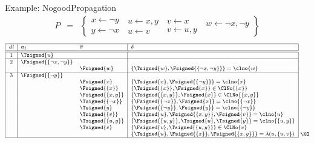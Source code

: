 \begin{frame}{Example: {NogoodPropagation}}
%
\begin{eqnarray*}
P
& = &
\left\{
  \begin{array}{l}
x  \leftarrow  \neg y\\%
y  \leftarrow  \neg x
\end{array}
\
\begin{array}{l}
u  \leftarrow x,y\\%
u  \leftarrow v%
\end{array}
\
\begin{array}{l}
v  \leftarrow x\\%
v  \leftarrow u,y%
\end{array}
\
\begin{array}{l}
w  \leftarrow \neg x,\neg y\\
\mbox{~}
\end{array}
\right\}
\end{eqnarray*}
%
\[
\footnotesize
\begin{array}[b]{|c|ll|l|}
\hline
\mathit{dl}& \sigma_{\!d} & \overline{\sigma} & \delta
\\\hline\hline
1 & \Tsigned{u} & &
\\\hline
2 & \Fsigned{\{\neg x,\neg y\}} & &
\\
  & & \Fsigned{w}     & \{\Tsigned{w},\Fsigned{\{\neg x,\neg y\}}\}=\clno{w}
\\\hline
3 & \Fsigned{\{\neg y\}} & &
\\
  & & \Fsigned{x}     & \{\Tsigned{x},\Fsigned{\{\neg y\}}\}=\clno{x}
\\
  & & \Fsigned{\{x\}} & \{\Tsigned{\{x\}},\Fsigned{x}\}\in\ClNo{\{x\}}
\\
  & & \Fsigned{\{x,y\}} & \{\Tsigned{\{x,y\}},\Fsigned{x}\}\in\ClNo{\{x,y\}}
\\
  & & \Tsigned{\{\neg x\}} & \{\Fsigned{\{\neg x\}},\Fsigned{x}\}=\clno{\{\neg x\}}
\\
  & & \Tsigned{y} & \{\Fsigned{\{\neg y\}},\Fsigned{y}\}=\clno{\{\neg y\}}
\\
  & & \Tsigned{\{v\}} & \{\Tsigned{u},\Fsigned{\{x,y\}},\Fsigned\{v\}\}=\clno{u}
\\
  & & \Tsigned{\{u,y\}} & \{\Fsigned{\{u,y\}},\Tsigned{u},\Tsigned{y}\}=\clno{\{u,y\}}
\\
  & & \Tsigned{v} & \{\Fsigned{v},\Tsigned{\{u,y\}}\}\in\ClNo{v}
\\
  & & & \{\Tsigned{u},\Fsigned{\{x\}},\Fsigned{\{x,y\}}\}=\lambda(u,\{u,v\})
\\\hline
\end{array}
~\raisebox{1mm}{\KO}
\]
\end{frame}

